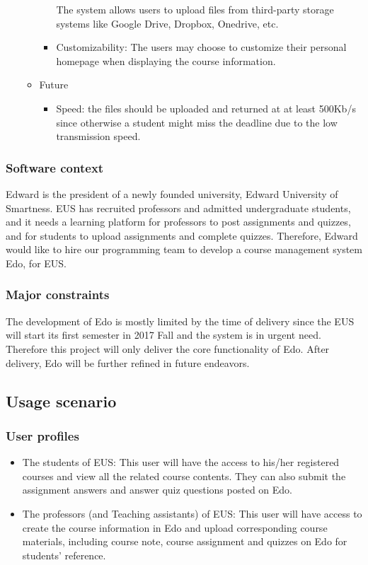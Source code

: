 \documentclass[paper=a4, fontsize=11pt]{scrartcl}
\numberwithin{equation}{section}		%
\numberwithin{figure}{section}			%
\numberwithin{table}{section}				%
\begin{document}
\begin{enumerate}
\begin{itemize}
\begin{itemize}
			The system allows users to upload files from third-party storage systems like Google Drive, Dropbox, Onedrive, etc.
			\item Customizability: The users may choose to customize their personal homepage when displaying the course information.
		\end{itemize}
		\item Future
		\begin{itemize}
			\item Speed: the files should be uploaded and returned at at least 500Kb/s since otherwise a student might miss the deadline due to the low transmission speed.
		\end{itemize}
	\end{itemize}	
\end{enumerate}

\subsubsection{Software context}
Edward is the president of a newly founded university, Edward University of Smartness. EUS has recruited professors and admitted undergraduate students, and it needs a learning platform for professors to post assignments and quizzes, and for students to upload assignments and complete quizzes. Therefore, Edward would like to hire our programming team to develop a course management system Edo, for EUS.
\subsubsection{Major constraints}
The development of Edo is mostly limited by the time of delivery since the EUS will start its first semester in 2017 Fall and the system is in urgent need. Therefore this project will only deliver the core functionality of Edo. After delivery, Edo will be further refined in future endeavors.

\subsection{Usage scenario}

\subsubsection{User profiles}
\begin{itemize}
	\item The students of EUS: This user will have the access to his/her registered courses and view all the related course contents. They can also submit the assignment answers and answer quiz questions posted on Edo.
	\item The professors (and Teaching assistants) of EUS: This user will have access to create the course information in Edo and upload corresponding course materials, including course note, course assignment and quizzes on Edo for students' reference.
\end{itemize}
\end{document}
